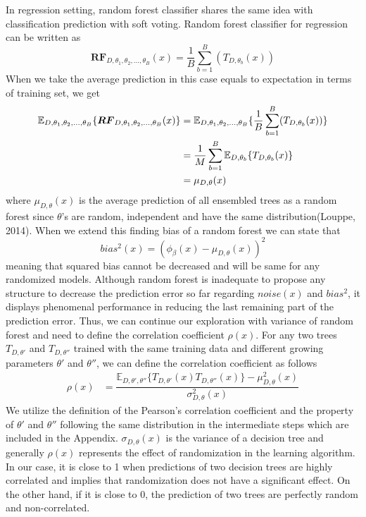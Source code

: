 In regression setting, random forest classifier shares the same idea with classification prediction with soft voting. Random forest classifier for regression can be written as
\begin{equation}
\boldsymbol{RF}_{D, \theta_{1},\theta_{2},..., \theta_{B}}(x) = \dfrac{1}{B}\sum_{b = 1}^{B}(T_{D,\theta_{b}}(x))
\end{equation}
When we take the average prediction in this case equals to expectation in terms of training set, we get
\begin{align}\label{eq:mu}
\mathbb{E}_{D, \theta_{1}, \theta_{2},..., \theta_{B}}\{\boldsymbol{RF}_{D, \theta_{1},\theta_{2},..., \theta_{B}}(x) \} & = 
	\mathbb{E}_{D, \theta_{1}, \theta_{2},..., \theta_{B}}\{\dfrac{1}{B}\sum_{b = 1}^{B}(T_{D,\theta_{b}}(x))\} \notag \\
	& = \dfrac{1}{M}\sum_{b=1}^{B}\mathbb{E}_{D,\theta_{b}}\{T_{D, \theta_{b}}(x)\}\notag \\
	& = \mu_{D,\theta}(x)
\end{align}
where $\mu_{D,\theta}(x)$ is the average prediction of all ensembled trees as a random forest since $\theta$'s are random, independent
and have the same distribution(Louppe, 2014). When we extend this finding bias of a random forest we can state that 
\begin{equation}
bias^2(x) = (\phi_{\beta}(x) - \mu_{D,\theta}(x))^2
\end{equation}
meaning that squared bias cannot be decreased and will be same for any randomized models. Although random forest is inadequate to propose any structure to decrease the prediction error so far regarding $noise(x)$ and $bias^2$, it displays phenomenal performance in reducing the last remaining part of the prediction error. Thus, we can continue our exploration with variance of random forest and need to define the correlation coefficient $\rho(x)$. For any two trees $T_{D,\theta'}$ and $T_{D,\theta''}$ trained with the same training data and different growing parameters $\theta'$ and $\theta''$, we can define the correlation coefficient as follows
\begin{align}
\rho(x) & = \dfrac{\mathbb{E}_{D,\theta',\theta''}\{T_{D,\theta'}(x) T_{D,\theta''}(x)\} - \mu_{D,\theta}^2(x)}{\sigma_{D,\theta}^2(x)}
\end{align}
We utilize the definition of the Pearson's correlation coefficient and the property of $\theta'$ and $\theta''$ following the same distribution in the intermediate steps which are included in the Appendix. $\sigma_{D, \theta}(x)$ is the variance of a decision tree and generally $\rho(x)$ represents the effect of randomization in the learning algorithm. In our case, it is close to 1 when predictions of two decision trees are highly correlated and implies that randomization does not have a significant effect. On the other hand, if it is close to 0, the prediction of two trees are perfectly random and non-correlated.

